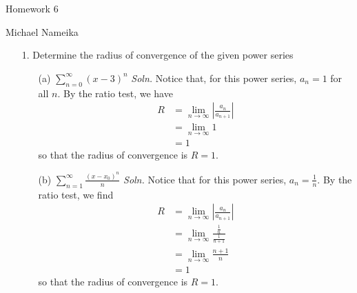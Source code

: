 \documentclass{article}
\begin{document}
\begin{center}
    {\Huge Homework 6}
    \vspace{0.5cm}

    {\Large Michael Nameika}
\end{center}

\begin{itemize}
    \item[1.] Determine the radius of convergence of the given power series
    \begin{itemize}
        \item[(a)] $\sum_{n = 0}^{\infty} (x - 3)^n$
        \newline\newline
        \textit{Soln.} Notice that, for this power series, $a_n = 1$ for all $n$. By the ratio test, we have 
        \begin{align*}
            R &= \lim_{n \to \infty} \left|\frac{a_n}{a_{n+1}}\right|\\
            &= \lim_{n \to \infty} 1\\
            &= 1
        \end{align*}
        so that the radius of convergence is $R = 1$.

        \item[(b)] $\sum_{n = 1}^{\infty} \frac{(x - x_0)^n}{n}$
        \newline\newline
        \textit{Soln.} Notice that for this power series, $a_n = \tfrac{1}{n}$. By the ratio test, we find
        \begin{align*}
            R &= \lim_{n \to \infty} \left|\frac{a_n}{a_{n+1}}\right|\\
            &= \lim_{n \to \infty} \frac{\frac{1}{n}}{\frac{1}{n+1}}\\
            &= \lim_{n \to \infty} \frac{n+1}{n}\\
            &= 1
        \end{align*}
        so that the radius of convergence is $R = 1$.


\end{itemize}
\end{itemize}
\end{document}

